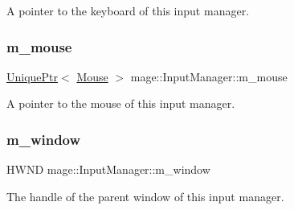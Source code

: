 A pointer to the keyboard of this input manager. \hypertarget{classmage_1_1_input_manager_aab9773cccf9626a7e2acb99227b42e37}{}\label{classmage_1_1_input_manager_aab9773cccf9626a7e2acb99227b42e37} 
\subsubsection{\texorpdfstring{m\+\_\+mouse}{m\_mouse}}
{\footnotesize\ttfamily \hyperlink{namespacemage_a3316d7143a973e37adf1110f2e80ca31}{Unique\+Ptr}$<$ \hyperlink{classmage_1_1_mouse}{Mouse} $>$ mage\+::\+Input\+Manager\+::m\+\_\+mouse\hspace{0.3cm}{\ttfamily [private]}}

A pointer to the mouse of this input manager. \hypertarget{classmage_1_1_input_manager_a2f8a8cc8c12b899a0c3b9983bdef6ed6}{}\label{classmage_1_1_input_manager_a2f8a8cc8c12b899a0c3b9983bdef6ed6} 
\subsubsection{\texorpdfstring{m\+\_\+window}{m\_window}}
{\footnotesize\ttfamily H\+W\+ND mage\+::\+Input\+Manager\+::m\+\_\+window\hspace{0.3cm}{\ttfamily [private]}}

The handle of the parent window of this input manager. 